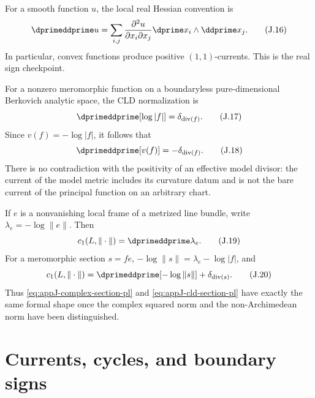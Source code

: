 For a smooth function \(u\), the local real Hessian convention is
\begin{equation*}
 \dprimeddprime u
 =\sum_{i,j}\frac{\partial^2u}{\partial x_i\partial x_j}
       \dprime x_i\wedge\ddprime x_j.
 \tag{J.16}\label{eq:appJ-real-hessian}
\end{equation*}
In particular, convex functions produce positive \((1,1)\)-currents.
This is the real sign checkpoint.

For a nonzero meromorphic function on a boundaryless pure-dimensional
Berkovich analytic space, the CLD normalization is
\begin{equation*}
 \dprimeddprime[\log|f|]=\delta_{\operatorname{div}(f)}.
 \tag{J.17}\label{eq:appJ-cld-pl}
\end{equation*}
Since \(v(f)=-\log|f|\), it follows that
\begin{equation*}
 \dprimeddprime[v(f)]=-\delta_{\operatorname{div}(f)}.
 \tag{J.18}\label{eq:appJ-valuation-pl}
\end{equation*}
There is no contradiction with the positivity of an effective model divisor:
the current of the model metric includes its curvature datum and is not the
bare current of the principal function on an arbitrary chart.

If \(e\) is a nonvanishing local frame of a metrized line bundle, write
\(\lambda_e=-\log\|e\|\).  Then
\begin{equation*}
 c_1(L,\|\cdot\|)=\dprimeddprime\lambda_e.
 \tag{J.19}\label{eq:appJ-cld-c1}
\end{equation*}
For a meromorphic section \(s=fe\),
\(-\log\|s\|=\lambda_e-\log|f|\), and
\begin{equation*}
 c_1(L,\|\cdot\|)
 =\dprimeddprime[-\log\|s\|]
  +\delta_{\operatorname{div}(s)}.
 \tag{J.20}\label{eq:appJ-cld-section-pl}
\end{equation*}
Thus \eqref{eq:appJ-complex-section-pl} and
\eqref{eq:appJ-cld-section-pl} have exactly the same formal shape once the
complex squared norm and the non-Archimedean norm have been distinguished.

\section{Currents, cycles, and boundary signs}
\label{sec:appJ-currents}

